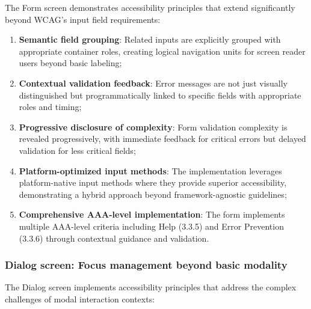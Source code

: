 The Form screen demonstrates accessibility principles that extend significantly beyond WCAG's input field requirements:

\begin{enumerate}
    \item \textbf{Semantic field grouping}: Related inputs are explicitly grouped with appropriate container roles, creating logical navigation units for screen reader users beyond basic labeling;
    
    \item \textbf{Contextual validation feedback}: Error messages are not just visually distinguished but programmatically linked to specific fields with appropriate roles and timing;
    
    \item \textbf{Progressive disclosure of complexity}: Form validation complexity is revealed progressively, with immediate feedback for critical errors but delayed validation for less critical fields;
    
    \item \textbf{Platform-optimized input methods}: The implementation leverages platform-native input methods where they provide superior accessibility, demonstrating a hybrid approach beyond framework-agnostic guidelines;
    
    \item \textbf{Comprehensive AAA-level implementation}: The form implements multiple AAA-level criteria including Help (3.3.5) and Error Prevention (3.3.6) through contextual guidance and validation.
\end{enumerate}

\subsubsection{Dialog screen: Focus management beyond basic modality}
\label{subsubsec:dialogs-beyond-wcag}

The Dialog screen implements accessibility principles that address the complex challenges of modal interaction contexts:

